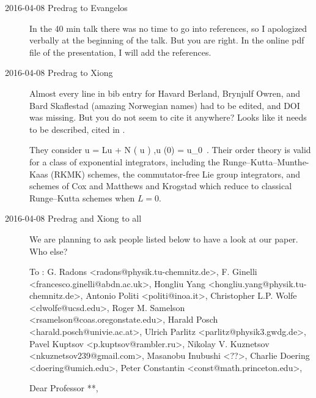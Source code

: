 \begin{description}
\item[2016-04-08 Predrag to Evangelos]
In the 40 min talk there was no time to go into references, so I
apologized verbally at the beginning of the talk. But you are right. In
the online pdf file of the presentation, I will add the references.



\item[2016-04-08 Predrag to Xiong] Almost every line in bib entry for
Havard Berland, Brynjulf Owren, and Bard Skaflestad
(amazing Norwegian names) had to be edited, and DOI was missing. But you
do not seem to cite it anywhere? Looks like it needs to be described,
cited in .

They consider
\beq
u = Lu + N ( u ) ,u (0) = u_0
\,.
Their order theory is valid for a class of exponential integrators,
including the Runge–Kutta–Munthe-Kaas (RKMK) schemes, the
commutator-free Lie group integrators, and schemes of Cox and
Matthews and Krogstad which reduce to
classical Runge–Kutta schemes when $L =0$.

\item[2016-04-08 Predrag and Xiong to all] We are planning to ask people
listed below to have a look at our paper. Who else?

To : G. Radons <radons@physik.tu-chemnitz.de>,
     F. Ginelli <francesco.ginelli@abdn.ac.uk>,
     Hongliu Yang <hongliu.yang@physik.tu-chemnitz.de>,
     Antonio Politi <politi@inoa.it>,
     Christopher L.P. Wolfe <clwolfe@ucsd.edu>,
     Roger M. Samelson <rsamelson@coas.oregonstate.edu>,
     Harald Posch <harald.posch@univie.ac.at>,
     Ulrich Parlitz <parlitz@physik3.gwdg.de>,
     Pavel Kuptsov <p.kuptsov@rambler.ru>,
     Nikolay V. Kuznetsov <nkuznetsov239@gmail.com>,
     Masanobu Inubushi <??>,
     Charlie Doering <doering@umich.edu>,
     Peter Constantin <const@math.princeton.edu>,


Dear Professor **,


\end{description}
